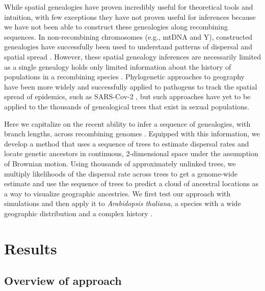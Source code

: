 \documentclass[12pt]{article}
\begin{document}
While spatial genealogies have proven incredibly useful for theoretical tools and intuition, with few exceptions they have not proven useful for inferences because we have not been able to construct these genealogies along recombining sequences. In non-recombining chromosomes (e.g., mtDNA and Y), constructed genealogies have successfully been used to understand patterns of dispersal and spatial spread \citep{avise2009phylogeography}. However, these spatial genealogy inferences are necessarily limited as a single genealogy holds only limited information about the history of populations in a recombining species \citep{barton1995genealogies}. Phylogenetic approaches to geography \citep[`phylogeography';][]{knowles2009statistical} have been more widely and successfully applied to pathogens to track the spatial spread of epidemics, such as SARS-Cov-2 \citep{martin2021insights}, but such approaches have yet to be applied to the thousands of genealogical trees that exist in sexual populations. 

Here we capitalize on the recent ability to infer a sequence of genealogies, with branch lengths, across recombining genomes \citep[][reviewed in \citet{wong2024general,lewanski2024era,nielsen2024inference}]{rasmussen2014genome,speidel2019method,wohns2021unified,schaefer2021ancestral,zhang2023biobank,gunnarsson2024scalable,deng2024robust}. Equipped with this information, we develop a method that uses a sequence of trees to estimate dispersal rates and locate genetic ancestors in continuous, 2-dimensional space under the assumption of Brownian motion. Using thousands of approximately unlinked trees, we multiply likelihoods of the dispersal rate across trees to get a genome-wide estimate and use the sequence of trees to predict a cloud of ancestral locations as a way to visualize geographic ancestries. We first test our approach with simulations and then apply it to \textit{Arabidopsis thaliana}, a species with a wide geographic distribution and a complex history \citep{fulgione2018archaic}.

\section*{Results}

\subsection*{Overview of approach} 
\end{document}
